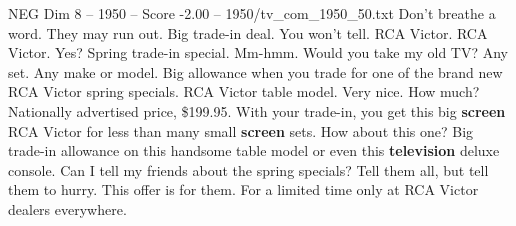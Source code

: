 \begin{textsample}{NEG Dim 8 – 1950 – Score -2.00 – 1950/tv\_com\_1950\_50.txt}  \label{ex:f8_neg_087}
Don't breathe a word.
They may run out.
Big trade-in deal.
You won't tell.
RCA Victor.
RCA Victor.
Yes?
Spring trade-in special.
Mm-hmm.
Would you take my old TV?
Any set.
Any make or model.
Big allowance when you trade for one of the brand new RCA Victor spring specials.
RCA Victor table model.
Very nice.
How much?
Nationally advertised price, \$199.95.
With your trade-in, you get this big \textbf{screen} RCA Victor for less than many small \textbf{screen} sets.
How about this one?
Big trade-in allowance on this handsome table model or even this \textbf{television} deluxe console.
Can I tell my friends about the spring specials?
Tell them all, but tell them to hurry.
This offer is for them.
For a limited time only at RCA Victor dealers everywhere.

\end{textsample}
